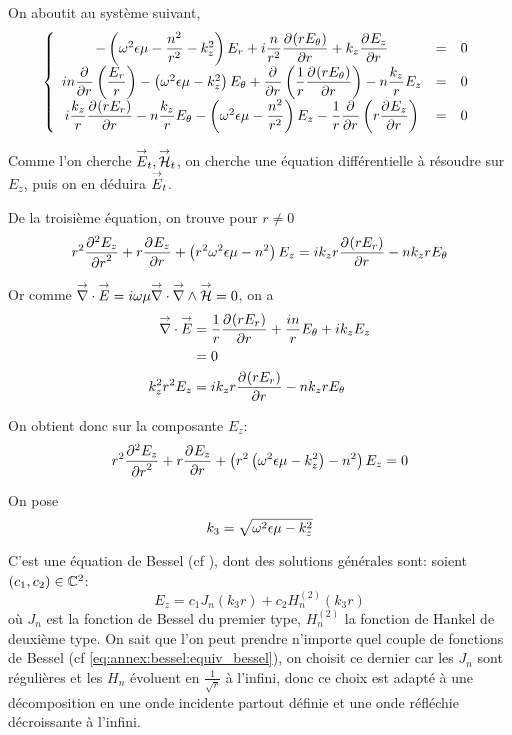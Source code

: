     On aboutit au système suivant,
    \begin{equation}
        \left\lbrace
        \begin{array}{ccc}
            -\left(\w^2\eps\mu -\frac{n^2}{r^2}  - k_z^2\right)E_r  +i\frac{n}{r^2}\ddr{r}{(rE_\theta)}  +k_z\ddr{r}{E_z} & = & 0\\
            in\ddr{r}{}\left(\frac{E_r}{r}\right) -\left(\w^2\eps\mu - k_z^2\right)E_\theta + \ddr{r}{}\left(\frac{1}{r}\ddr{r}{(rE_\theta)}\right)  - n\frac{k_z}{r}E_z & = & 0\\
            i\frac{k_z}{r}\ddr{r}{(rE_r)}  - n\frac{k_z}{r}E_\theta  -\left(\w^2\eps\mu - \frac{n^2}{r^2} \right)E_z - \frac{1}{r}\ddr{r}{}\left(r\ddr{r}{E_z}\right) & = & 0
        \end{array}
        \right.
    \end{equation}

    Comme l'on cherche $\vE_t, \vH_t$, on cherche une équation différentielle à résoudre sur $E_z$, puis on en déduira $\vE_t$.

    De la troisième  équation, on trouve pour $r\not=0$
    \begin{equation}
    r^2 \ddr[2]{r}{E_z} + r\ddr{r}{E_z} + \left(r^2\w^2\eps\mu - n^2\right)E_z =ik_zr\ddr{r}{(rE_r)} -  nk_zrE_\theta
    \end{equation}

    Or comme $\vdiv \vE = i\w\mu\vdiv\vrot\vH = 0$, on a
    \begin{align}
        \vdiv\vE &= \frac{1}{r}\ddr{r}{(rE_r)} + \frac{in}{r}E_\theta + ik_zE_z
        \\
        &=0
        \\
        k_z^2r^2 E_z &= ik_zr\ddr{r}{(rE_r)} - nk_zrE_\theta
    \end{align}

    On obtient donc sur la composante $E_z$:
    \begin{equation}
        r^2 \ddr[2]{r}{E_z} + r\ddr{r}{E_z} + \left(r^2\left(\w^2\eps\mu - k_z^2\right) - n^2\right)E_z = 0
    \end{equation}

    On pose 
    \begin{equation}
        k_3 = \sqrt{\w^2\eps\mu - k_z^2}
    \end{equation}

    C'est une équation de Bessel (cf \cite[eq (6.80)]{bowman_introduction_1958}), dont des solutions générales sont: soient $(c_1,c_2) \in \CC^2$:
   \begin{equation}
        E_z = c_1 J_n\left(k_3r\right) + c_2 H_n^{(2)}\left(k_3r\right)
    \end{equation}
    où $J_n$ est la fonction de Bessel du premier type, $H_n^{(2)}$ la fonction de Hankel de deuxième type. On sait que l'on peut prendre n'importe quel couple de fonctions de Bessel (cf \eqref{eq:annex:bessel:equiv_bessel}), on choisit ce dernier car les $J_n$ sont régulières et les $H_n$ évoluent en $\frac{1}{\sqrt{r}}$ à l'infini, donc ce choix est adapté à une décomposition en une onde incidente partout définie et une onde réfléchie décroissante à l'infini.

